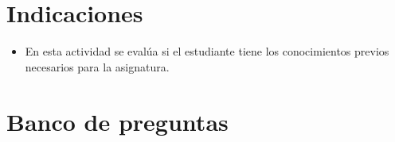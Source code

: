 \documentclass[a4,11pt]{aleph-notas}
\begin{document}
\encabezado

\vspace*{-8mm}
\section{Indicaciones}

\begin{itemize}[leftmargin=*]
\item 
    En esta actividad se evalúa si el estudiante tiene los conocimientos previos necesarios para la asignatura.

\end{itemize}

\section{Banco de preguntas}
\end{document}
